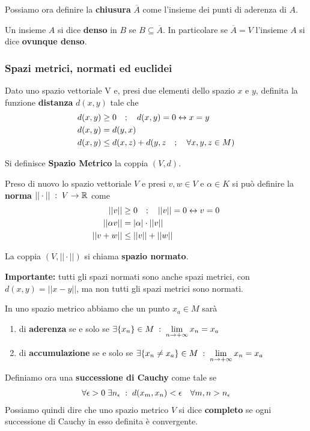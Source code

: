 Possiamo ora definire la \textbf{chiusura} $\overline{A}$ come l'insieme dei punti di aderenza di $A$. 

Un insieme $A$ si dice \textbf{denso} in $B$ se $B \subseteq \overline{A}$. In particolare se $\overline{A} = V$ l'insieme $A$ si dice \textbf{ovunque denso}.



\newpage
\subsubsection{Spazi metrici, normati ed euclidei}

Dato uno spazio  vettoriale V e, presi due elementi dello spazio $x$ e $y$, definita la funzione \textbf{distanza} $d(x,y)$ tale che
\begin{align}
	d(x,y) &\geq 0 \quad ; \quad d(x,y) = 0 \leftrightarrow x=y\\
	d(x,y) & = d(y,x)\\
	d(x,y) &\leq d(x,z) + d(y,z \quad ; \quad \forall x,y,z \in M) 
\end{align}

Si definisce \textbf{Spazio Metrico} la coppia $(V,d)$.

Preso di nuovo lo spazio vettoriale $V$ e presi $v,w\in V$ e $\alpha \in K$ si può definire la \textbf{norma} $||\cdot|| \; : \; V \rightarrow \mathbb{R}$ come
\begin{align}
	||v|| &\geq 0 \quad ; \quad ||v|| = 0 \leftrightarrow v= 0\\
	||\alpha v || &= |\alpha|\cdot ||v||\\
	||v + w|| &\leq ||v|| + ||w||
\end{align}

La coppia $(V, ||\cdot ||)$ si chiama \textbf{spazio normato}. 


\textbf{Importante:} tutti gli spazi normati sono anche spazi metrici, con $d(x,y) = ||x-y||$, ma non tutti gli spazi metrici sono normati.

In uno spazio metrico abbiamo che un punto $x_a\in M$ sarà
\begin{enumerate}
	\item di \textbf{aderenza} se e solo se $\exists \{x_n\} \in M \; : \; \underset{n \rightarrow +\infty}{\lim} \, x_n = x_a$
	\item di \textbf{accumulazione} se e solo se $\exists \{x_n\neq x_a\} \in M \; : \; \underset{n \rightarrow +\infty}{\lim} \, x_n = x_a$
\end{enumerate}

Definiamo ora una \textbf{successione di Cauchy} come tale se
\begin{align}
	\forall \epsilon > 0 \; \exists n_\epsilon \; : \; d(x_m,x_n) <\epsilon \quad \forall m,n > n_\epsilon
\end{align}
Possiamo quindi dire che uno spazio metrico $V$ si dice \textbf{completo} se ogni successione di Cauchy in esso definita è convergente.


